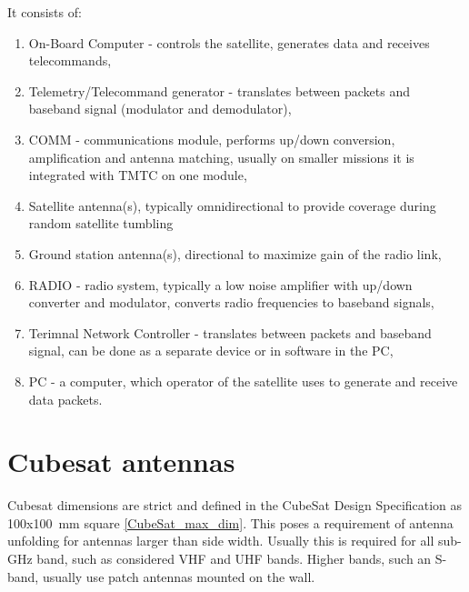 It consists of:
\begin{enumerate}
    \item On-Board Computer - controls the satellite, generates data and receives telecommands,
    \item Telemetry/Telecommand generator - translates between packets and baseband signal (modulator and demodulator),
    \item COMM - communications module, performs up/down conversion, amplification and antenna matching, usually on smaller missions it is integrated with TMTC on one module,
    \item Satellite antenna(s), typically omnidirectional to provide coverage during random satellite tumbling
    \item Ground station antenna(s), directional to maximize gain of the radio link,
    \item RADIO - radio system, typically a low noise amplifier with up/down converter and modulator, converts radio frequencies to baseband signals,
    \item Terimnal Network Controller - translates between packets and baseband signal, can be done as a separate device or in software in the PC,
    \item PC - a computer, which operator of the satellite uses to generate and receive data packets.
\end{enumerate}

\section{Cubesat antennas}
Cubesat dimensions are strict and defined in the CubeSat Design Specification \cite{cubesat_spec} as \si{100}x\si{100}~mm square \ref{CubeSat_max_dim}. This poses a requirement of antenna unfolding for antennas larger than side width. Usually this is required for all sub-GHz band, such as considered VHF and UHF bands. Higher bands, such an S-band, usually use patch antennas mounted on the wall.


